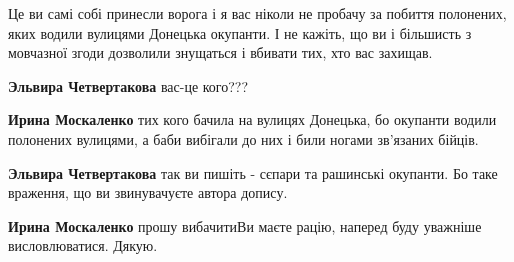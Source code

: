 \begin{itemize}
 

Це ви самі собі принесли ворога і я вас ніколи не пробачу за побиття
полонених, яких водили вулицями Донецька окупанти. І не кажіть, що ви і більшисть
з мовчазної згоди дозволили знущаться і вбивати тих, хто вас захищав.

\begin{itemize}
 
\textbf{Эльвира Четвертакова} вас-це кого???

 
\textbf{Ирина Москаленко} тих кого бачила на вулицях Донецька, бо окупанти водили полонених вулицями, а баби вибігали до них і били ногами зв'язаних бійців.

 
\textbf{Эльвира Четвертакова} так ви пишіть - сєпари та рашинські окупанти. Бо таке враження, що ви звинувачуєте автора допису.

 
\textbf{Ирина Москаленко} прошу вибачитиВи маєте рацію, наперед буду уважніше висловлюватися. Дякую.
\end{itemize}

 

\end{itemize}
